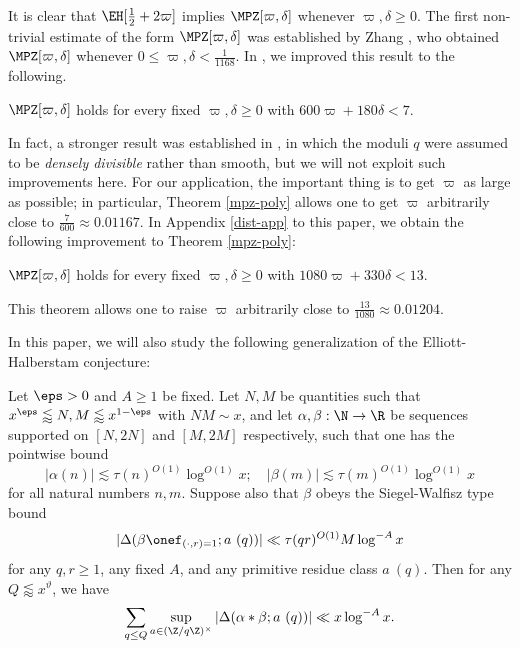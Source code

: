 It is clear that $\EH[\frac{1}{2}+2\varpi]$ implies $\MPZ[\varpi,\delta]$ whenever $\varpi,\delta \geq 0$.  The first non-trivial estimate of the form $\MPZ[\varpi,\delta]$ was established by Zhang \cite{zhang}, who obtained $\MPZ[\varpi,\delta]$ whenever $0 \leq \varpi, \delta < \frac{1}{1168}$.
In \cite[Theorem 2.17]{polymath8a}, we improved this result to the following.

\begin{theorem}\label{mpz-poly}  $\MPZ[\varpi,\delta]$ holds for every fixed $\varpi,\delta \geq 0$ with $600 \varpi + 180 \delta < 7$.
\end{theorem}

In fact, a stronger result was established in \cite{polymath8a}, in which the moduli $q$ were assumed to be \emph{densely divisible} rather than smooth, but we will not exploit such improvements here.  For our application, the important thing is to get $\varpi$ as large as possible; in particular, Theorem \ref{mpz-poly} allows one to get $\varpi$ arbitrarily close to $\frac{7}{600} \approx 0.01167$. In Appendix \ref{dist-app} to this paper, we obtain the following improvement to Theorem \ref{mpz-poly}:

\begin{theorem}\label{mpz-poly-improv}  $\MPZ[\varpi,\delta]$ holds for every fixed $\varpi,\delta \geq 0$ with $1080 \varpi + 330 \delta < 13$.
\end{theorem}

This theorem allows one to raise $\varpi$ arbitrarily close to $\frac{13}{1080} \approx 0.01204$.


In this paper, we will also study the following generalization of the Elliott-Halberstam conjecture:

\begin{claim}\label{geh-def}  Let $\eps > 0$ and $A \geq 1$ be fixed.  Let $N,M$ be quantities such that
$x^\eps \lessapprox N,M \lessapprox x^{1-\eps}$ with $NM \sim x$, and let $\alpha, \beta: \N \to \R$ be sequences supported on $[N,2N]$ and $[M,2M]$ respectively, such that one has the pointwise bound
\begin{equation}\label{ab-div}
 |\alpha(n)| \lesssim \tau(n)^{O(1)} \log^{O(1)} x; \quad |\beta(m)| \lesssim \tau(m)^{O(1)} \log^{O(1)} x
\end{equation}
for all natural numbers $n,m$.  Suppose also that $\beta$ obeys the Siegel-Walfisz type bound
\begin{equation}\label{sig}
| \Delta(\beta \onef_{(\cdot,r)=1}; a\ (q)) | \ll \tau(qr)^{O(1)} M \log^{-A} x 
\end{equation}
for any $q,r \geq 1$, any fixed $A$, and any primitive residue class $a\ (q)$.  Then for any $Q \lessapprox x^\vartheta$, we have
\begin{equation}\label{qq-gen}
 \sum_{q \leq Q} \sup_{a \in (\Z/q\Z)^\times} |\Delta(\alpha \ast \beta; a\ (q))| \ll x \log^{-A} x.
\end{equation} 
\end{claim}

